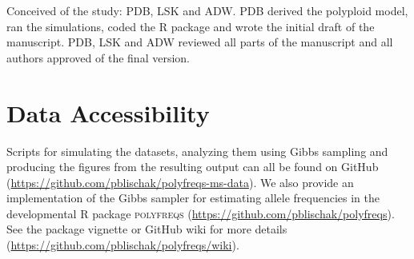 \documentclass[11pt,english,letterpaper,oneside]{article}
\begin{document}
Conceived of the study: PDB, LSK and ADW. PDB derived the polyploid model, ran the simulations, coded the R package and wrote the initial draft of the manuscript. PDB, LSK and ADW reviewed all parts of the manuscript and all authors approved of the final version.
\medskip

\section*{Data Accessibility}            %

Scripts for simulating the datasets, analyzing them using Gibbs sampling and producing the figures from the resulting output can all be found on GitHub (\url{https://github.com/pblischak/polyfreqs-ms-data}). We also provide an implementation of the Gibbs sampler for estimating allele frequencies in the developmental R package \textsc{polyfreqs} (\url{https://github.com/pblischak/polyfreqs}). See the package vignette or GitHub wiki for more details (\url{https://github.com/pblischak/polyfreqs/wiki}).

\end{document}
